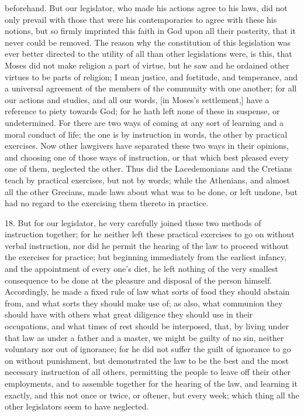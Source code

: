 beforehand. But our legislator, who made his actions agree to his laws,
did not only prevail with those that were his contemporaries to agree with
these his notions, but so firmly imprinted this faith in God upon all
their posterity, that it never could be removed. The reason why the
constitution of this legislation was ever better directed to the utility
of all than other legislations were, is this, that Moses did not make
religion a part of virtue, but he saw and he ordained other virtues to be
parts of religion; I mean justice, and fortitude, and temperance, and a
universal agreement of the members of the community with one another; for
all our actions and studies, and all our words, [in Moses's settlement,]
have a reference to piety towards God; for he hath left none of these in
suspense, or undetermined. For there are two ways of coming at any sort of
learning and a moral conduct of life; the one is by instruction in words,
the other by practical exercises. Now other lawgivers have separated these
two ways in their opinions, and choosing one of those ways of instruction,
or that which best pleased every one of them, neglected the other. Thus
did the Lacedemonians and the Cretians teach by practical exercises, but
not by words; while the Athenians, and almost all the other Grecians, made
laws about what was to be done, or left undone, but had no regard to the
exercising them thereto in practice.

18. But for our legislator, he very carefully joined these two methods of
instruction together; for he neither left these practical exercises to go
on without verbal instruction, nor did he permit the hearing of the law to
proceed without the exercises for practice; but beginning immediately from
the earliest infancy, and the appointment of every one's diet, he left
nothing of the very smallest consequence to be done at the pleasure and
disposal of the person himself. Accordingly, he made a fixed rule of law
what sorts of food they should abstain from, and what sorts they should
make use of; as also, what communion they should have with others what
great diligence they should use in their occupations, and what times of
rest should be interposed, that, by living under that law as under a
father and a master, we might be guilty of no sin, neither voluntary nor
out of ignorance; for he did not suffer the guilt of ignorance to go on
without punishment, but demonstrated the law to be the best and the most
necessary instruction of all others, permitting the people to leave off
their other employments, and to assemble together for the hearing of the
law, and learning it exactly, and this not once or twice, or oftener, but
every week; which thing all the other legislators seem to have neglected.

